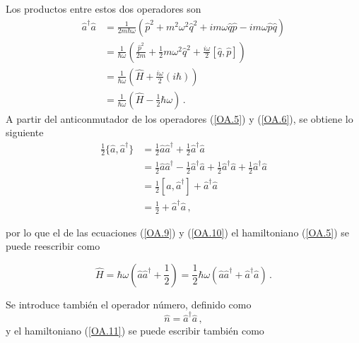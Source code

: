 Los productos entre estos dos operadores son
\begin{align}
\hat{a}^{\dagger}\hat{a} & = \frac{1}{2m\hbar\omega} \left( \hat{p}^2 + m^2\omega^2\hat{q}^2 + im\omega\hat{q}\hat{p} - im\omega\hat{p}\hat{q} \right) \nonumber     \\
& = \frac{1}{\hbar\omega}\left( \frac{\hat{p}^2}{2m} + \frac{1}{2}m\omega^2\hat{q}^2 +\frac{i\omega}{2} [\hat{q}, \hat{p}] \right) 
\nonumber\\
& = \frac{1}{\hbar\omega} \left( \hat{H} + \frac{i\omega}{2}(i\hbar) \right) \nonumber \\ 
&= \frac{1}{\hbar\omega} \left( \hat{H} - \frac{1}{2}\hbar\omega \right) \label{OA.9}\,.
\end{align}
A partir del anticonmutador de los operadores (\ref{OA.5}) y (\ref{OA.6}), se obtiene lo siguiente
\begin{align}
\frac{1}{2}\{ \hat{a},\hat{a}^{\dagger}\} & = \frac{1}{2}\hat{a}\hat{a}^{\dagger} + \frac{1}{2}\hat{a}^{\dagger}\hat{a}                                                \nonumber \\
& = \frac{1}{2}\hat{a}\hat{a}^{\dagger} - \frac{1}{2}\hat{a}^{\dagger}\hat{a} +\frac{1}{2}\hat{a}^{\dagger}\hat{a} + \frac{1}{2}\hat{a}^{\dagger}\hat{a} \nonumber\\
& = \frac{1}{2}[\hat{a},\hat{a}^{\dagger}] + \hat{a}^{\dagger}\hat{a}                                                        \nonumber \\
& = \frac{1}{2} + \hat{a}^{\dagger}\hat{a} \label{OA.10}\,,
\end{align}

por lo que el de las ecuaciones (\ref{OA.9}) y (\ref{OA.10}) el hamiltoniano (\ref{OA.5}) se puede reescribir como

\begin{equation}
\label{OA.11}
\hat{H} = \hbar \omega \left(\hat{a} \hat{a}^{\dagger} + \frac{1}{2}\right) = \frac{1}{2}\hbar \omega \left( \hat{a}\hat{a}^{\dagger} + \hat{a}^{\dagger}\hat{a} \right) \,.
\end{equation}

Se introduce también el operador número, definido como
\begin{equation}
\label{OA.12}
\hat{n} = \hat{a}^{\dagger} \hat{a}\,,
\end{equation}
y el hamiltoniano (\ref{OA.11}) se puede escribir también como

